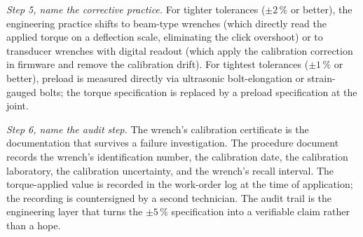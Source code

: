 \begin{exercise}
\textit{Step 5, name the corrective practice.} For tighter
tolerances ($\pm 2\,\%$ or better), the engineering practice
shifts to beam-type wrenches (which directly read the applied
torque on a deflection scale, eliminating the click overshoot) or
to transducer wrenches with digital readout (which apply the
calibration correction in firmware and remove the calibration
drift). For tightest tolerances ($\pm 1\,\%$ or better), preload
is measured directly via ultrasonic bolt-elongation or
strain-gauged bolts; the torque specification is replaced by a
preload specification at the joint.

\textit{Step 6, name the audit step.} The wrench's calibration
certificate is the documentation that survives a failure
investigation. The procedure document records the wrench's
identification number, the calibration date, the calibration
laboratory, the calibration uncertainty, and the wrench's recall
interval. The torque-applied value is recorded in the work-order
log at the time of application; the recording is countersigned by
a second technician. The audit trail is the engineering layer that
turns the $\pm 5\,\%$ specification into a verifiable claim rather
than a hope.
\end{exercise}

